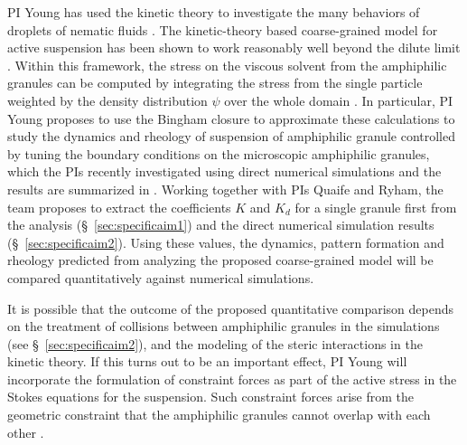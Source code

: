 PI Young has used the kinetic theory to investigate the many behaviors of droplets of
nematic fluids \cite{YoungShelleyStein2021_MBE}. 
The kinetic-theory based coarse-grained model for active suspension has been shown to work reasonably well beyond the dilute limit \cite{Saintillan2018_ARFM}.
Within this framework, the stress on the viscous solvent from the amphiphilic granules can be computed
by integrating the stress from the single particle weighted by the density distribution $\psi$ over the whole domain \cite{TraversoMichellin2020_PRF,TraversoMichellin2022_JFM}.
In particular, PI Young proposes to use the Bingham closure \cite{YoungShelleyStein2021_MBE} to approximate these calculations to study the
dynamics and rheology of suspension of amphiphilic granule controlled by tuning the boundary conditions on the microscopic amphiphilic granules, 
which the PIs recently investigated using direct numerical simulations and the results are summarized in \cite{fu-ryh-qua-you2022}. Working together with PIs Quaife and Ryham, the team proposes to extract the coefficients
$K$ and $K_d$ for a single granule first from the analysis (\S~\ref{sec:specificaim1}) and the direct numerical simulation results (\S~\ref{sec:specificaim2}). 
Using these values, the dynamics, pattern formation and rheology
predicted from analyzing the proposed coarse-grained model will be compared quantitatively against numerical simulations. 

It is possible that the outcome of the proposed quantitative comparison depends on the treatment of collisions between amphiphilic granules 
in the simulations (see \S~\ref{sec:specificaim2}), 
and the modeling of the steric interactions in the kinetic theory. If this turns out to be an important effect, PI Young will incorporate the formulation of constraint forces as part of the active stress in the Stokes equations for the suspension.  Such constraint forces arise from the geometric 
constraint that the amphiphilic granules cannot overlap with each other \cite{Weady2022_PRF}. 

